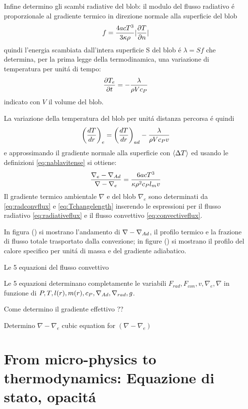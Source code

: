 \begin{wordonframe}{}
Infine determino gli scambi radiative del blob: il modulo del flusso radiativo \'e proporzionale al gradiente termico in direzione normale alla superficie del blob
\begin{equation*}
f=\frac{4acT^3}{3\kappa\rho}|\PDy{n}{T}|
\end{equation*}
quindi l'energia scambiata dall'intera superficie S del blob \'e $\lambda=Sf$ che determina, per la prima legge della termodinamica, una variazione di temperatura per unit\'a di tempo:
\begin{equation*}
\PDy{t}{T_e}=-\frac{\lambda}{\rho Vc_P}
\end{equation*}
indicato con $V$ il volume del blob.

La variazione della temperatura del blob per unit\'a distanza percorsa \'e quindi
\begin{equation*}
\Dcvar{\TDy{r}{T}}{e}=\Dcvar{\TDy{r}{T}}{ad}-\frac{\lambda}{\rho Vc_Pv}\label{eq:Tchangelength}
\end{equation*}
e approssimando il gradiente normale alla superficie con $\exv{\Delta T}$ ed usando le definizioni \eqref{eq:nablavitense} si ottiene:
\begin{equation*}
\frac{\nabla_e-\nad{}}{\nabla-\nabla_e}=\frac{6acT^3}{\kappa\rho^2c_Pl_mv}
\end{equation*}
Il gradiente termico ambientale $\nabla$ e del blob $\nabla_e$ sono determinati da \eqref{eq:radconvflux} e \eqref{eq:Tchangelength} inserendo le espressioni per il flusso radiativo \eqref{eq:radiativeflux} e il flusso convettivo \eqref{eq:convectiveflux}.

In figura () si mostrano l'andamento di $\nabla-\nad{}$, il profilo termico e la frazione di flusso totale trasportato dalla convezione; in figure () si mostrano il profilo del calore specifico per unit\'a di massa e del gradiente adiabatico.

Le 5 equazioni del flusso convettivo

Le 5 equazioni determinano completamente le variabili $F_{rad}, F_{con}, v, \nabla_e, \nabla$ in funzione di $P,T,l(r),m(r),c_P,\nad{},\nrad{},g$.

Come determino il gradiente effettivo ??

Determino $\nabla-\nabla_e$
cubic equation for $(\nabla-\nabla_e)$

\end{wordonframe}

\section{From micro-physics to thermodynamics: Equazione di stato, opacit\'a}

